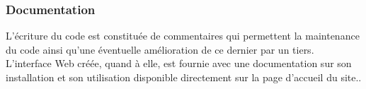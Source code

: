 \subsubsection{Documentation}
L'écriture du code est constituée de commentaires qui permettent la maintenance du code ainsi qu'une éventuelle amélioration de ce dernier par un tiers.\\
L'interface Web créée, quand à elle, est fournie avec une documentation sur son installation et son utilisation disponible directement sur la page d’accueil du site..
